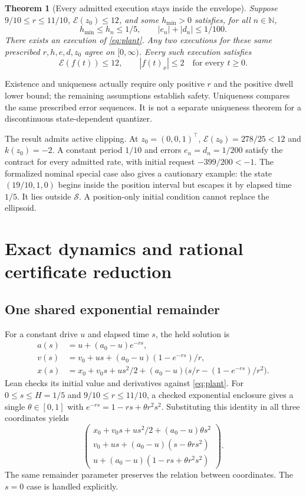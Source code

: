 \documentclass[10pt]{article}
\newtheorem{theorem}{Theorem}
\newcommand{\E}{\mathcal E}
\begin{document}
\begin{theorem}[Every admitted execution stays inside the envelope]\label{thm:main}
Suppose $9/10\le r\le11/10$, $\E(z_0)\le12$, and some $h_{\min}>0$ satisfies, for all $n\in\mathbb N$,
\[
 h_{\min}\le h_n\le1/5,\qquad |e_n|+|d_n|\le1/100.
\]
There exists an execution of \eqref{eq:plant}. Any two executions for these same prescribed $r,h,e,d,z_0$ agree on $[0,\infty)$. Every such execution satisfies
\[
 \E(f(t))\le12,\qquad |f(t)_x|\le2\quad\text{for every }t\ge0.
\]
\end{theorem}
Existence and uniqueness actually require only positive $r$ and the positive dwell lower bound; the remaining assumptions establish safety. Uniqueness compares the same prescribed error sequences. It is not a separate uniqueness theorem for a discontinuous state-dependent quantizer.

The result admits active clipping. At $z_0=(0,0,1)^\top$,
$\E(z_0)=278/25<12$ and $k(z_0)=-2$. A constant period $1/10$ and errors $e_n=d_n=1/200$ satisfy the contract for every admitted rate, with initial request $-399/200<-1$. The formalized nominal special case also gives a cautionary example: the state $(19/10,1,0)$ begins inside the position interval but escapes it by elapsed time $1/5$. It lies outside $\mathcal S$. A position-only initial condition cannot replace the ellipsoid.

\section{Exact dynamics and rational certificate reduction}
\subsection{One shared exponential remainder}
For a constant drive $u$ and elapsed time $s$, the held solution is
\begin{align}\label{eq:exact}
 a(s)&=u+(a_0-u)e^{-rs},\nonumber\\
 v(s)&=v_0+us+(a_0-u)(1-e^{-rs})/r,\\
 x(s)&=x_0+v_0s+us^2/2+(a_0-u)\bigl(s/r-(1-e^{-rs})/r^2\bigr).\nonumber
\end{align}
Lean checks its initial value and derivatives against \eqref{eq:plant}.
For $0\le s\le H=1/5$ and $9/10\le r\le11/10$, a checked exponential enclosure gives a single $\theta\in[0,1]$ with
$e^{-rs}=1-rs+\theta r^2s^2$. Substituting this identity in all three coordinates yields
\begin{equation}\label{eq:poly}
\begin{pmatrix}
x_0+v_0s+us^2/2+(a_0-u)\theta s^2\\
v_0+us+(a_0-u)(s-\theta rs^2)\\
u+(a_0-u)(1-rs+\theta r^2s^2)
\end{pmatrix}.
\end{equation}
The same remainder parameter preserves the relation between coordinates. The $s=0$ case is handled explicitly.
\end{document}
